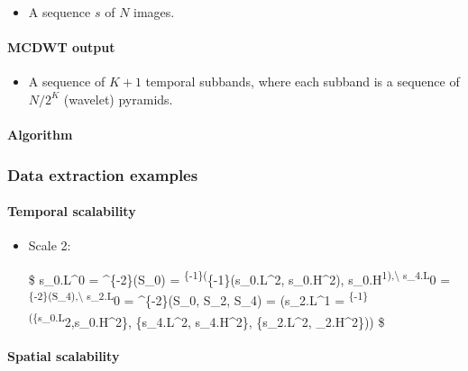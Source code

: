 \begin{itemize}
\tightlist
\item
  A sequence \(s\) of \(N\) images.
\end{itemize}

\hypertarget{mcdwt-output}{%
\paragraph{MCDWT output}\label{mcdwt-output}}

\begin{itemize}
\tightlist
\item
  A sequence of \(K+1\) temporal subbands, where each subband is a
  sequence of \(N/2^K\) (wavelet) pyramids.
\end{itemize}

\hypertarget{algorithm}{%
\paragraph{Algorithm}\label{algorithm}}

    \hypertarget{data-extraction-examples}{%
\subsubsection{Data extraction
examples}\label{data-extraction-examples}}

    \hypertarget{temporal-scalability}{%
\paragraph{Temporal scalability}\label{temporal-scalability}}

\begin{itemize}
\item
  Scale 2:

  \$ s\_0.L\^{}0 = \^{}\{-2\}(S\_0) =
  \textsuperscript{\{-1\}(}\{-1\}(s\_0.L\^{}2,
  s\_0.H\^{}2), s\_0.H\textsuperscript{1),\textbackslash{} s\_4.L}0 =
  \textsuperscript{\{-2\}(S\_4),\textbackslash{} s\_2.L}0 =
  \^{}\{-2\}(S\_0, S\_2, S\_4) = (s\_2.L\^{}1 =
  \textsuperscript{\{-1\}(\{s\_0.L}2,s\_0.H\^{}2\},
  \{s\_4.L\^{}2, s\_4.H\^{}2\}, \{s\_2.L\^{}2, \_2.H\^{}2\}))
  \$
\end{itemize}

    \hypertarget{spatial-scalability}{%
\paragraph{Spatial scalability}\label{spatial-scalability}}

